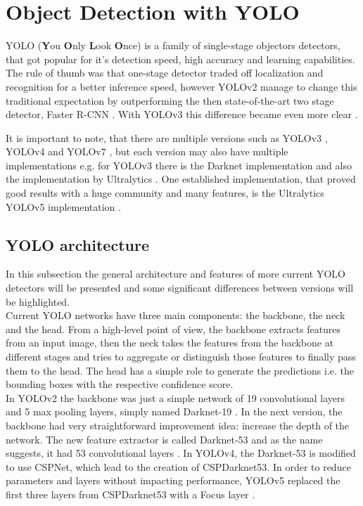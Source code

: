 \section{Object Detection with YOLO}
YOLO (\textbf{Y}ou \textbf{O}nly \textbf{L}ook \textbf{O}nce) is a family of single-stage objectors detectors, that got popular for it's detection speed, high accuracy and learning capabilities. The rule of thumb was that one-stage detector traded off localization and recognition for a better inference speed, however YOLOv2 manage to change this traditional expectation by outperforming the then state-of-the-art two stage detector, Faster R-CNN \cite{yolov2_paper}. With YOLOv3 this difference became even more clear \cite{yolov3_vs}.

It is important to note, that there are multiple versions such as
YOLOv3 \cite{yolov3_paper}, YOLOv4 \cite{yolov4_paper} and YOLOv7 \cite{yolov7_paper}, but each version may also have multiple implementations e.g. for YOLOv3 there is the Darknet implementation \cite{darknet_git} and also the implementation by Ultralytics \cite{yolov3_ultralytics_git}. One established implementation, that proved good results with a huge community and many features, is the Ultralytics YOLOv5 implementation \cite{yolov5_git}.


\subsection{YOLO architecture}

In this subsection the general architecture and features of more current YOLO detectors will be presented and some significant differences between versions will be highlighted. \\
Current YOLO networks have three main components: the backbone, the neck and the head. From a high-level point of view, the backbone extracts features from an input image, then the neck takes the features from the backbone at different stages and tries to aggregate or distinguish those features to finally pass them to the head. The head has a simple role to generate the predictions i.e. the bounding boxes with the respective confidence score. \\
In YOLOv2 the backbone was just a simple network of 19 convolutional layers and 5 max pooling layers, simply named Darknet-19 \cite{yolov2_paper}. In the next  version, the backbone had very straightforward improvement idea: increase the depth of the network. The new feature extractor is called Darknet-53 and as the name suggests, it had 53 convolutional layers \cite{yolov3_paper}. In YOLOv4, the Darknet-53 is modified to use CSPNet, which lead to the creation of CSPDarknet53. In order to reduce parameters and layers without impacting performance, YOLOv5 replaced the first three layers from CSPDarknet53 with a Focus layer \cite{yolov5_focus}. \\

